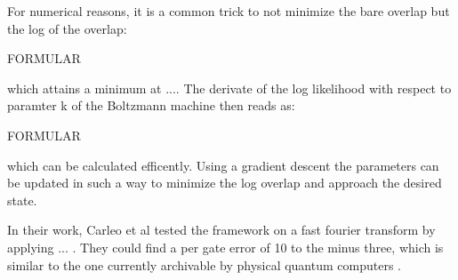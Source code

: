 For numerical reasons, it is a common trick to not minimize the bare overlap but the log of the overlap:

FORMULAR

which attains a minimum at .... The derivate of the log likelihood with respect to paramter k of the Boltzmann machine then 
reads as:

FORMULAR

which can be calculated efficently. Using a gradient descent the parameters can be updated in such a way to minimize the log
overlap and approach the desired state.

In their work, Carleo et al tested the framework on a fast fourier transform by applying ... . They could find a per gate 
error of 10 to the minus three, which is similar to the one currently archivable by physical quantum computers \cite{}.